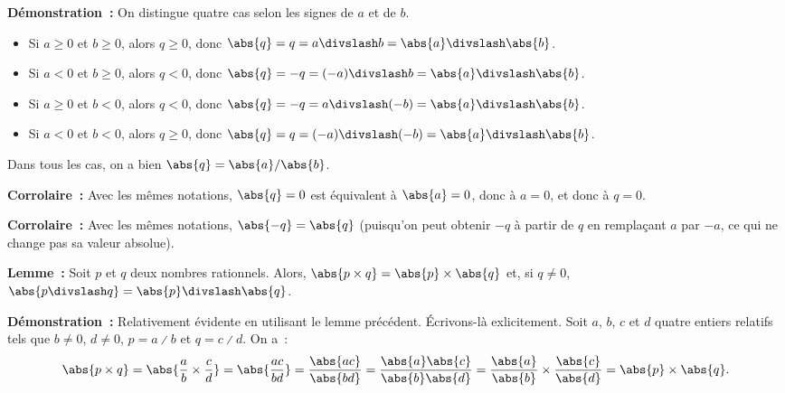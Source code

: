 \medskip

\noindent\textbf{Démonstration :} On distingue quatre cas selon les signes de $a$ et de $b$.
    \begin{itemize}[nosep]
        \item Si $a \geq 0$ et $b \geq 0$, alors $q \geq 0$, donc $\abs{q} = q = a \divslash b = \abs{a} \divslash \abs{b}$.
        \item Si $a < 0$ et $b \geq 0$, alors $q < 0$, donc $\abs{q} = - q = (-a) \divslash b = \abs{a} \divslash \abs{b}$.
        \item Si $a \geq 0$ et $b < 0$, alors $q < 0$, donc $\abs{q} = - q = a \divslash (-b) = \abs{a} \divslash \abs{b}$.
        \item Si $a < 0$ et $b < 0$, alors $q \geq 0$, donc $\abs{q} = q = (-a) \divslash (-b) = \abs{a} \divslash \abs{b}$.
    \end{itemize}
    Dans tous les cas, on a bien $\abs{q} = \abs{a} / \abs{b}$.

    \done

\medskip

\noindent\textbf{Corrolaire :} Avec les mêmes notations, $\abs{q} = 0$ est équivalent à $\abs{a} = 0$, donc à $a = 0$, et donc à $q = 0$.

\medskip

\noindent\textbf{Corrolaire :} Avec les mêmes notations, $\abs{-q} = \abs{q}$ (puisqu'on peut obtenir $-q$ à partir de $q$ en remplaçant $a$ par $-a$, ce qui ne change pas sa valeur absolue).

\medskip

\noindent\textbf{Lemme :} Soit $p$ et $q$ deux nombres rationnels.
    Alors, $\abs{p \times q} = \abs{p} \times \abs{q}$ et, si $q \neq 0$, $\abs{p \divslash q} = \abs{p} \divslash \abs{q}$.

\medskip

\noindent\textbf{Démonstration :} Relativement évidente en utilisant le lemme précédent. 
    Écrivons-là exlicitement.
    Soit $a$, $b$, $c$ et $d$ quatre entiers relatifs tels que $b \neq 0$, $d \neq 0$, $p = a \divslash b$ et $q = c \divslash d$.
    On a : 
    \begin{equation*}
        \abs{p \times q} 
        = \abs{\frac{a}{b} \times \frac{c}{d}}
        = \abs{\frac{a c}{b d}}
        = \frac{\abs{a c}}{\abs{b d}}
        = \frac{\abs{a} \abs{c}}{\abs{b} \abs{d}}
        = \frac{\abs{a}}{\abs{b}} \times \frac{\abs{c}}{\abs{d}}
        = \abs{p} \times \abs{q} .
    \end{equation*}

